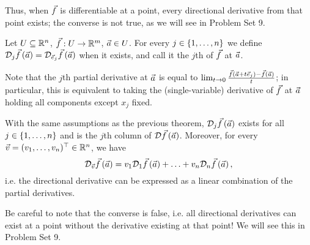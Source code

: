 \documentclass[main.tex]{subfiles}
\begin{document}
Thus, when $\vec{f}$ is differentiable at a point, every directional derivative from that point exists; the converse is not true, as we will see in Problem Set 9.

\begin{definition}
    Let $U\subseteq \mathbb R^n$, $\vec{f} : U\to \mathbb R^m$, $\vec{a}\in U$. For every $j \in \left\{ 1, \ldots , n \right\}$ we define $\mathcal{D}_j\vec{f}\left( \vec{a} \right) = \mathcal{D}_{\vec{e}_j}\vec{f}\left( \vec{a} \right)$ when it exists, and call it the $j$th  of $\vec{f}$ at $\vec{a}$.
\end{definition}

Note that the $j$th partial derivative at $\vec{a}$ is equal to $\lim_{t\to 0} \frac{\vec{f}\left( \vec{a} + t\vec{e}_j \right) - \vec{f}\left( \vec{a} \right)}{t}$; in particular, this is equivalent to taking the (single-variable) derivative of $\vec{f}$ at $\vec{a}$ holding all components except $x_j$ fixed.

\begin{theorem}
    With the same assumptions as the previous theorem, $\mathcal{D}_j\vec{f}\left( \vec{a} \right)$ exists for all $j\in \left\{ 1, \ldots , n \right\}$ and is the $j$th column of $\mathcal{D}\vec{f}\left( \vec{a} \right)$. Moreover, for every $\vec{v} = (v_1, \ldots , v_n)^\top\in \mathbb R^n$, we have
    \[\mathcal{D}_{\vec{v}} \vec{f}\left( \vec{a} \right) = v_1 \mathcal{D}_1\vec{f}\left( \vec{a} \right) + \ldots + v_n\mathcal{D}_n\vec{f}\left( \vec{a} \right),\]
    i.e. the directional derivative can be expressed as a linear combination of the partial derivatives.
\end{theorem}

Be careful to note that the converse is false, i.e. all directional derivatives can exist at a point without the derivative existing at that point! We will see this in Problem Set 9.
\end{document}

